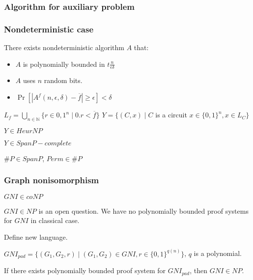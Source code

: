 \begin{frame}
    \frametitle{Algorithm for auxiliary problem}

    
\end{frame}
\begin{frame}
    \frametitle{Nondeterministic case}

    \begin{statement}%
        There exists nondeterministic algorithm $A$ that:
        \begin{itemize}
	        \item $A$ is polynomially bounded in $t\frac{n}{\epsilon\delta}$
        	\item $A$ uses $n$ random bits.
        	\item $\Pr[|A^{f}(n, \epsilon, \delta) - \overline{f}| \ge \epsilon] <
		        \delta$
        \end{itemize}
    \end{statement}

    $L_f = \bigcup\limits_{n \in \mathbb{N}}\{r \in {0, 1}^n \mid 0.r < \overline{f}\}$
	$Y = \{(C, x) \mid C$ is a circuit $x \in \{0, 1\}^n, x \in L_{C}\}$
    
    \begin{lemma}
        $Y \in HeurNP$
    \end{lemma}

    \begin{statement}
        $Y \in SpanP-complete$
    \end{statement}
    
    $\#P \in SpanP$, $Perm \in \#P$
\end{frame}

\begin{frame}
    \frametitle{Graph nonisomorphism}

    $GNI \in coNP$
    
    $GNI \in NP$ is an open question. We have no polynomially bounded proof systems
    for $GNI$ in classical case.

    Define new language.

    \begin{definition}
        $GNI_{pad} = \{(G_1, G_2, r) \mid (G_1, G_2) \in GNI,
        r \in \{0, 1\}^{q(n)}\}$, $q$ is a polynomial.
    \end{definition}

    \begin{lemma}
        If there exists polynomially bounded proof system for
        $GNI_{pad}$, then $GNI \in NP$.
    \end{lemma}
\end{frame}


